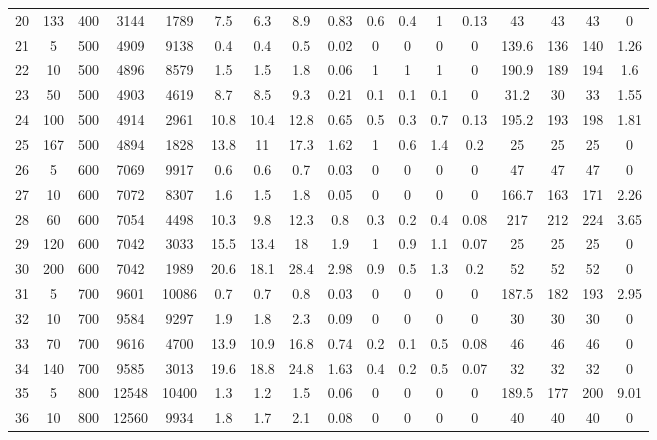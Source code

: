 \documentclass[11pt]{article}
\newcommand{\np}{\newpage}
\begin{document}
\begin{appendices}
\begin{landscape}
\begin{longtable}[c]{ccccc|cccc|cccc|cccc}
				20 & 133 & 400 & 3144 & 1789 & 7.5 & 6.3 & 8.9 & 0.83 & 0.6 & 0.4 & 1 & 0.13 & 43 & 43 & 43 & 0 \\ \np
				\rowcolor[HTML]{EFEFEF} 
				21 & 5 & 500 & 4909 & 9138 & 0.4 & 0.4 & 0.5 & 0.02 & 0 & 0 & 0 & 0 & 139.6 & 136 & 140 & 1.26 \\
				\rowcolor[HTML]{EFEFEF} 
				22 & 10 & 500 & 4896 & 8579 & 1.5 & 1.5 & 1.8 & 0.06 & 1 & 1 & 1 & 0 & 190.9 & 189 & 194 & 1.6 \\
				\rowcolor[HTML]{EFEFEF} 
				23 & 50 & 500 & 4903 & 4619 & 8.7 & 8.5 & 9.3 & 0.21 & 0.1 & 0.1 & 0.1 & 0 & 31.2 & 30 & 33 & 1.55 \\
				\rowcolor[HTML]{EFEFEF} 
				24 & 100 & 500 & 4914 & 2961 & 10.8 & 10.4 & 12.8 & 0.65 & 0.5 & 0.3 & 0.7 & 0.13 & 195.2 & 193 & 198 & 1.81 \\
				\rowcolor[HTML]{EFEFEF} 
				25 & 167 & 500 & 4894 & 1828 & 13.8 & 11 & 17.3 & 1.62 & 1 & 0.6 & 1.4 & 0.2 & 25 & 25 & 25 & 0 \\
				26 & 5 & 600 & 7069 & 9917 & 0.6 & 0.6 & 0.7 & 0.03 & 0 & 0 & 0 & 0 & 47 & 47 & 47 & 0 \\
				27 & 10 & 600 & 7072 & 8307 & 1.6 & 1.5 & 1.8 & 0.05 & 0 & 0 & 0 & 0 & 166.7 & 163 & 171 & 2.26 \\
				28 & 60 & 600 & 7054 & 4498 & 10.3 & 9.8 & 12.3 & 0.8 & 0.3 & 0.2 & 0.4 & 0.08 & 217 & 212 & 224 & 3.65 \\
				29 & 120 & 600 & 7042 & 3033 & 15.5 & 13.4 & 18 & 1.9 & 1 & 0.9 & 1.1 & 0.07 & 25 & 25 & 25 & 0 \\
				30 & 200 & 600 & 7042 & 1989 & 20.6 & 18.1 & 28.4 & 2.98 & 0.9 & 0.5 & 1.3 & 0.2 & 52 & 52 & 52 & 0 \\
				\rowcolor[HTML]{EFEFEF} 
				31 & 5 & 700 & 9601 & 10086 & 0.7 & 0.7 & 0.8 & 0.03 & 0 & 0 & 0 & 0 & 187.5 & 182 & 193 & 2.95 \\
				\rowcolor[HTML]{EFEFEF} 
				32 & 10 & 700 & 9584 & 9297 & 1.9 & 1.8 & 2.3 & 0.09 & 0 & 0 & 0 & 0 & 30 & 30 & 30 & 0 \\
				\rowcolor[HTML]{EFEFEF} 
				33 & 70 & 700 & 9616 & 4700 & 13.9 & 10.9 & 16.8 & 0.74 & 0.2 & 0.1 & 0.5 & 0.08 & 46 & 46 & 46 & 0 \\
				\rowcolor[HTML]{EFEFEF} 
				34 & 140 & 700 & 9585 & 3013 & 19.6 & 18.8 & 24.8 & 1.63 & 0.4 & 0.2 & 0.5 & 0.07 & 32 & 32 & 32 & 0 \\
				35 & 5 & 800 & 12548 & 10400 & 1.3 & 1.2 & 1.5 & 0.06 & 0 & 0 & 0 & 0 & 189.5 & 177 & 200 & 9.01 \\
				36 & 10 & 800 & 12560 & 9934 & 1.8 & 1.7 & 2.1 & 0.08 & 0 & 0 & 0 & 0 & 40 & 40 & 40 & 0 \\

\end{longtable}
\end{landscape}
\end{appendices}
\end{document}
